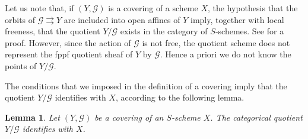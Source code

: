 \documentclass{amsart}
\newtheorem{lemm}{Lemma}[section]
\theoremstyle{definition}
\theoremstyle{remark}
\begin{document}
Let us note that, if $(Y,{{\mathcal G}})$ is a covering of a scheme $X$, the hypothesis that the orbits of ${{\mathcal G}} {\rightrightarrows} Y$ are included into open affines of $Y$ imply, together with local freeness, that the quotient $Y/{{\mathcal G}}$ exists in the category of $S$-schemes. See \cite[Exp V, th.4.1]{SGA3} for a proof. However, since the action of ${{\mathcal G}}$ is not free, the quotient scheme does not represent the fppf quotient sheaf of $Y$ by ${{\mathcal G}}$. Hence a priori we do not know the points of $Y/{{\mathcal G}}$.

The conditions that we imposed in the definition of a covering imply that the quotient $Y/{{\mathcal G}}$ identifies with $X$, according to the following lemma.
\begin{lemm}

Let $(Y,{{\mathcal G}})$ be a covering of an $S$-scheme $X$. The categorical quotient $Y/{{\mathcal G}}$ identifies with $X$. 

\end{lemm}
\end{document}
